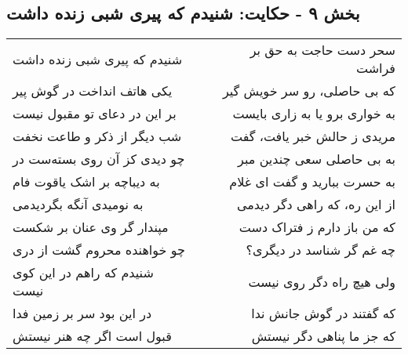\begin{center}
\section*{بخش ۹ - حکایت: شنیدم که پیری شبی زنده داشت}
\label{sec:009}
\begin{longtable}{l p{0.5cm} r}
شنیدم که پیری شبی زنده داشت
&&
سحر دست حاجت به حق بر فراشت
\\
یکی هاتف انداخت در گوش پیر
&&
که بی حاصلی، رو سر خویش گیر
\\
بر این در دعای تو مقبول نیست
&&
به خواری برو یا به زاری بایست
\\
شب دیگر از ذکر و طاعت نخفت
&&
مریدی ز حالش خبر یافت، گفت
\\
چو دیدی کز آن روی بسته‌ست در
&&
به بی حاصلی سعی چندین مبر
\\
به دیباچه بر اشک یاقوت فام
&&
به حسرت ببارید و گفت ای غلام
\\
به نومیدی آنگه بگردیدمی
&&
از این ره، که راهی دگر دیدمی
\\
مپندار گر وی عنان بر شکست
&&
که من باز دارم ز فتراک دست
\\
چو خواهنده محروم گشت از دری
&&
چه غم گر شناسد در دیگری؟
\\
شنیدم که راهم در این کوی نیست
&&
ولی هیچ راه دگر روی نیست
\\
در این بود سر بر زمین فدا
&&
که گفتند در گوش جانش ندا
\\
قبول است اگر چه هنر نیستش
&&
که جز ما پناهی دگر نیستش
\\
\end{longtable}
\end{center}
